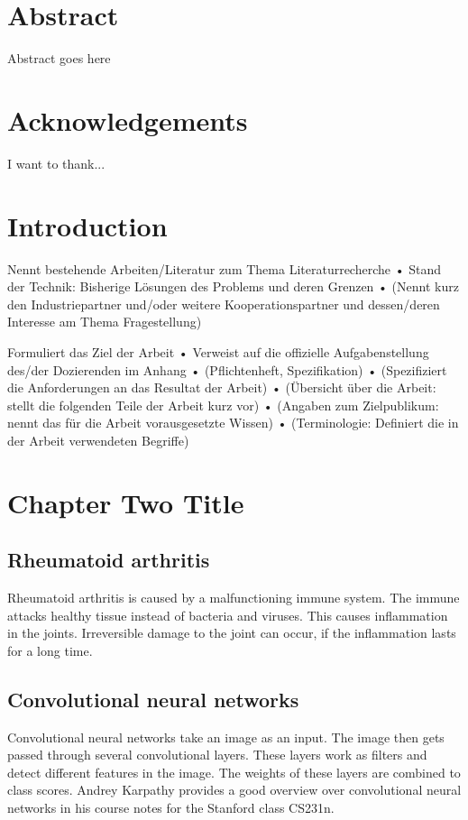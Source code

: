 \documentclass[12pt]{article}
\begin{document}
\newpage

\section*{Abstract}
Abstract goes here

\newpage

\section*{Acknowledgements}
I want to thank...

\newpage

\tableofcontents

\newpage

\section{Introduction}
Nennt bestehende Arbeiten/Literatur zum Thema Literaturrecherche • Stand der Technik: Bisherige Lösungen des Problems und deren Grenzen • (Nennt kurz den Industriepartner und/oder weitere Kooperationspartner und dessen/deren Interesse am Thema Fragestellung) 

Formuliert das Ziel der Arbeit • Verweist auf die offizielle Aufgabenstellung des/der Dozierenden im Anhang • (Pflichtenheft, Spezifikation) • (Spezifiziert die Anforderungen an das Resultat der Arbeit) • (Übersicht über die Arbeit: stellt die folgenden Teile der Arbeit kurz vor) • (Angaben zum Zielpublikum: nennt das für die Arbeit vorausgesetzte Wissen) • (Terminologie: Definiert die in der Arbeit verwendeten Begriffe) 

\section{Chapter Two Title}
\subsection{Rheumatoid arthritis}
\label{subsec:rheuma}

Rheumatoid arthritis is caused by a malfunctioning immune system. The immune attacks healthy tissue instead of bacteria and viruses. This causes inflammation in the joints. Irreversible damage to the joint can occur, if the inflammation lasts for a long time. \cite{rheuma}

\subsection{Convolutional neural networks}
\label{subsec:cnn}
Convolutional neural networks take an image as an input. The image then gets passed through several convolutional layers. These layers work as filters and detect different features in the image. The weights of these layers are combined to class scores. Andrey Karpathy provides a good overview over convolutional neural networks in his course notes for the Stanford class CS231n. \cite{cnn}
\end{document}
